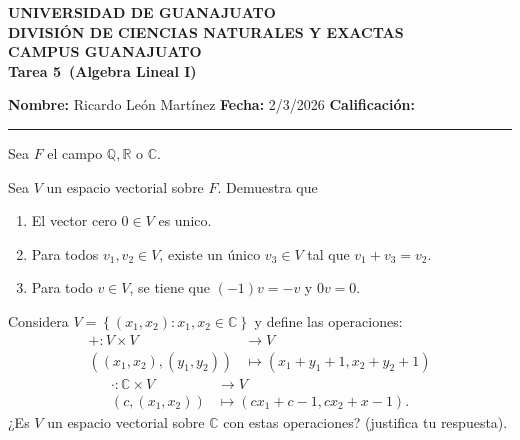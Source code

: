 \documentclass[12pt,a4paper]{article}
\newcommand{\alumno}{Ricardo León Martínez}
\newcommand{\materia}{Algebra Lineal I}
\newcommand{\tarea}{Tarea 5}
\newcommand{\fecha}{2/3/2026}
\begin{document}
    \begin{center}
        {\large\textbf{UNIVERSIDAD DE GUANAJUATO}}\\[0.3cm]
        {\normalsize\textbf{DIVISIÓN DE CIENCIAS NATURALES Y EXACTAS}}\\
        {\normalsize\textbf{CAMPUS GUANAJUATO}}\\[1cm]

        {\Large\textbf{\tarea\ (\materia)}}\\[1cm]
    \end{center}

    \noindent
    \textbf{Nombre:} \alumno 
    \hfill 
    \textbf{Fecha:} \fecha 
    \hfill 
    \textbf{Calificación:} \rule{3cm}{0.4pt}

    \vspace{0.3cm}

    Sea $F$ el campo $\mathbb{Q},\mathbb{R}$ o $\mathbb{C}$.

    \begin{mdframed}[style=mdbluebox,frametitle={Ejercicio 1}]
        Sea $V$ un espacio vectorial sobre $F$. Demuestra que
        \begin{enumerate}
            \item[(a)] El vector cero $0\in V$ es unico.
            \item[(b)] Para todos $v_{1},v_{2}\in V$, existe un único $v_{3}\in V$ tal que
            $v_{1}+v_{3}=v_{2}$.
            \item[(c)] Para todo $v\in V$, se tiene que $(-1)v=-v$ y $0v=0$. 
        \end{enumerate}
    \end{mdframed}

    \begin{mdframed}[style=mdbluebox,frametitle={Ejercicio 2}]
        Considera $V=\left\{(x_{1},x_{2}):x_{1},x_{2}\in\mathbb{C}\right\}$ y define las operaciones:
        \begin{align*}
            +:V\times V&\to V\\
            \left((x_{1},x_{2}),(y_{1},y_{2})\right)&\mapsto(x_{1}+y_{1}+1,x_{2}+y_{2}+1)
        \end{align*}
        \begin{align*}
            \cdot :\mathbb{C}\times V&\to V\\
            \left(c,(x_{1},x_{2})\right)&\mapsto(cx_{1}+c-1,cx_{2}+x-1).
        \end{align*}
        ¿Es $V$ un espacio vectorial sobre $\mathbb{C}$ con estas operaciones? (justifica tu respuesta).
    \end{mdframed}
\end{document}
